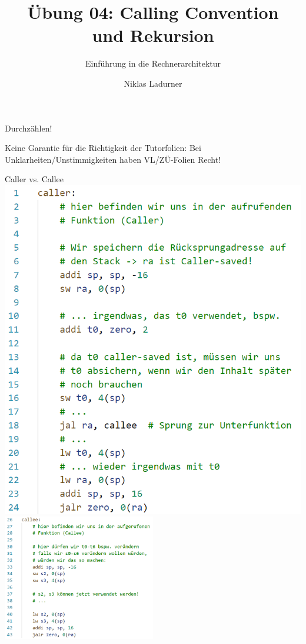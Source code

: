 \documentclass[
  german,            %
  aspectratio=169,    %
]{tumbeamer}
\title{Übung 04: Calling Convention \\und Rekursion}
\subtitle{Einführung in die Rechnerarchitektur}
\author{Niklas Ladurner}
\institute{\theChairName\\\theDepartmentName\\\theUniversityName}
\date{\DTMdisplaydate{2023}{11}{10}{-1}}
\begin{document}
\maketitle

\begin{frame}[c]{}{}
  \begin{center}
    \LARGE  Durchzählen!
  \end{center}
\end{frame}

\begin{frame}[c]{}{}
  \begin{center}
    \LARGE  Keine Garantie für die Richtigkeit der Tutorfolien: Bei Unklarheiten/Unstimmigkeiten 
    haben VL/ZÜ-Folien Recht!
  \end{center}
\end{frame}

\begin{frame}[c]{Caller vs. Callee}{}
  \includegraphics[height=0.75\textheight]{resources/w04_caller.png}
  \includegraphics[width=0.5\textwidth]{resources/w04_callee.png}
\end{frame}
\end{document}
